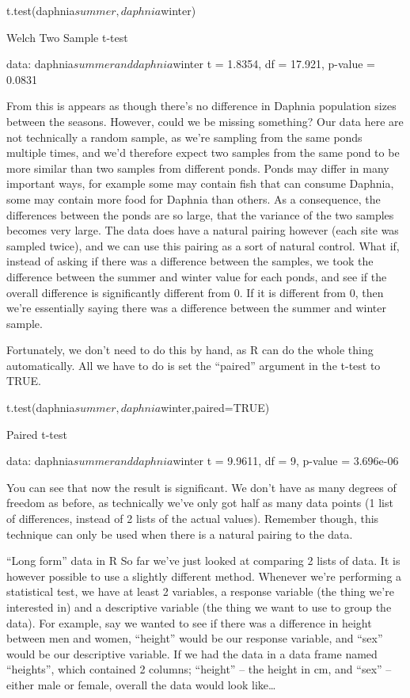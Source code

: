 \documentclass{article}
\begin{document}
t.test(daphnia$summer, daphnia$winter)

	Welch Two Sample t-test

data:  daphnia$summer and daphnia$winter 
t = 1.8354, df = 17.921, p-value = 0.0831

From this is appears as though there’s no difference in Daphnia population sizes between the seasons. However, could we be missing something? Our data here are not technically a random sample, as we’re sampling from the same ponds multiple times, and we’d therefore expect two samples from the same pond to be more similar than two samples from different ponds. Ponds may differ in many important ways, for example some may contain fish that can consume Daphnia, some may contain more food for Daphnia than others. As a consequence, the differences between the ponds are so large, that the variance of the two samples becomes very large. The data does have a natural pairing however (each site was sampled twice), and we can use this pairing as a sort of natural control. What if, instead of asking if there was a difference between the samples, we took the difference between the summer and winter value for each ponds, and see if the overall difference is significantly different from 0. If it is different from 0, then we’re essentially saying there was a difference between the summer and winter sample. 

Fortunately, we don’t need to do this by hand, as R can do the whole thing automatically. All we have to do is set the “paired” argument in the t-test to TRUE.

t.test(daphnia$summer, daphnia$winter,paired=TRUE)

	Paired t-test

data:  daphnia$summer and daphnia$winter 
t = 9.9611, df = 9, p-value = 3.696e-06

You can see that now the result is significant. We don’t have as many degrees of freedom as before, as technically we’ve only got half as many data points (1 list of differences, instead of 2 lists of the actual values). Remember though, this technique can only be used when there is a natural pairing to the data. 

“Long form” data in R
So far we’ve just looked at comparing 2 lists of data. It is however possible to use a slightly different method. Whenever we’re performing a statistical test, we have at least 2 variables, a response variable (the thing we’re interested in) and a descriptive variable (the thing we want to use to group the data). For example, say we wanted to see if there was a difference in height between men and women, “height” would be our response variable, and “sex” would be our descriptive variable. If we had the data in a data frame named “heights”, which contained 2 columns; “height” – the height in cm, and “sex” – either male or female, overall the data would look like…
\end{document}
